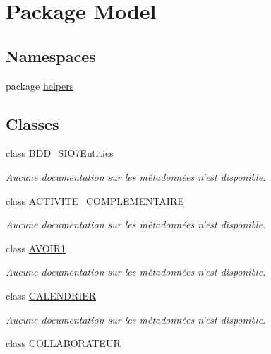 \hypertarget{namespace_model}{\section{Package Model}
\label{namespace_model}
}
\subsection*{Namespaces}
\begin{DoxyCompactItemize}
\item 
package \hyperlink{namespace_model_1_1helpers}{helpers}
\end{DoxyCompactItemize}
\subsection*{Classes}
\begin{DoxyCompactItemize}
\item 
class \hyperlink{class_model_1_1_b_d_d___s_i_o7_entities}{B\-D\-D\-\_\-\-S\-I\-O7\-Entities}
\begin{DoxyCompactList}\small\item\em Aucune documentation sur les métadonnées n'est disponible. \end{DoxyCompactList}\item 
class \hyperlink{class_model_1_1_a_c_t_i_v_i_t_e___c_o_m_p_l_e_m_e_n_t_a_i_r_e}{A\-C\-T\-I\-V\-I\-T\-E\-\_\-\-C\-O\-M\-P\-L\-E\-M\-E\-N\-T\-A\-I\-R\-E}
\begin{DoxyCompactList}\small\item\em Aucune documentation sur les métadonnées n'est disponible. \end{DoxyCompactList}\item 
class \hyperlink{class_model_1_1_a_v_o_i_r1}{A\-V\-O\-I\-R1}
\begin{DoxyCompactList}\small\item\em Aucune documentation sur les métadonnées n'est disponible. \end{DoxyCompactList}\item 
class \hyperlink{class_model_1_1_c_a_l_e_n_d_r_i_e_r}{C\-A\-L\-E\-N\-D\-R\-I\-E\-R}
\begin{DoxyCompactList}\small\item\em Aucune documentation sur les métadonnées n'est disponible. \end{DoxyCompactList}\item 
class \hyperlink{class_model_1_1_c_o_l_l_a_b_o_r_a_t_e_u_r}{C\-O\-L\-L\-A\-B\-O\-R\-A\-T\-E\-U\-R}

\end{DoxyCompactItemize}
